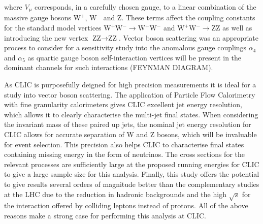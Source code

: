 \noindent where $V_{\mu}$ corresponds, in a carefully chosen gauge, to a linear combination of the massive gauge bosons $\text{W}^{+}$, $\text{W}^{-}$ and Z.  These terms affect the coupling constants for the standard model vertices $\text{W}^{+}\text{W}^{-} \rightarrow \text{W}^{+}\text{W}^{-}$ and $\text{W}^{+}\text{W}^{-} \rightarrow \text{Z}\text{Z}$ as well as introducing the new vertex $\text{Z}\text{Z} \rightarrow \text{Z}\text{Z}$.  Vector boson scattering was an appropriate process to consider for a sensitivity study into the anomalous gauge couplings $\alpha_{4}$ and $\alpha_{5}$ as quartic gauge boson self-interaction vertices will be present in the dominant channels for such interactions (FEYNMAN DIAGRAM). 

As CLIC is purposefully deigned for high precision measurements it is ideal for a study into vector boson scattering.  The application of Particle Flow Calorimetry with fine granularity calorimeters gives CLIC excellent jet energy resolution, which allows it to clearly characterise the multi-jet final states.  When considering the invariant mass of these paired up jets, the nominal jet energy resolution for CLIC allows for accurate separation of W and Z bosons, which will be invaluable for event selection.  This precision also helps CLIC to characterise final states containing missing energy in the form of neutrinos.  The cross sections for the relevant processes are sufficiently large at the proposed running energies for CLIC to give a large sample size for this analysis.  Finally, this study offers the potential to give results several orders of magnitude better than the complementary studies at the LHC due to the reduction in hadronic backgrounds and the high $\sqrt{s}$ for the interaction offered by colliding leptons instead of protons.  All of the above reasons make a strong case for performing this analysis at CLIC.  

